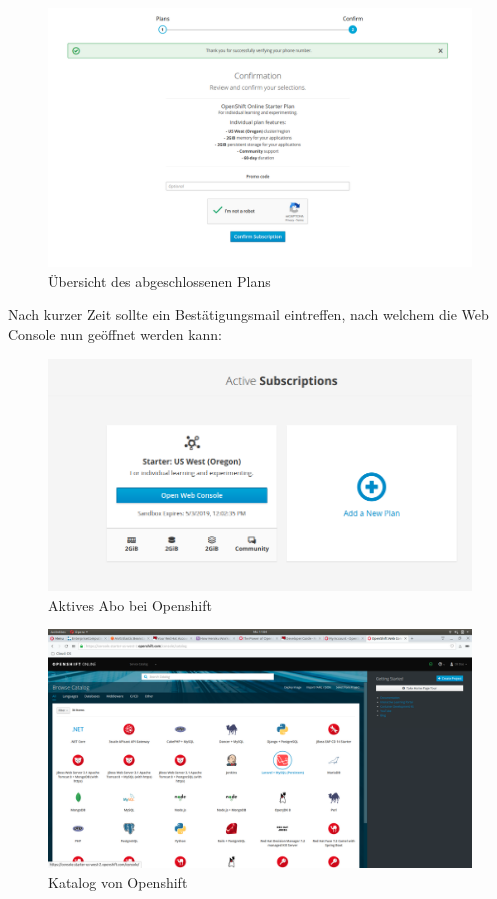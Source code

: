 \documentclass[12pt,a4paper]{article}
\begin{document}
\begin{figure}
	\centering
	\includegraphics[width=0.7\linewidth]{img/os-overview}
	\caption{Übersicht des abgeschlossenen Plans}
	\label{fig:os-overview}
\end{figure}
Nach kurzer Zeit sollte ein Bestätigungsmail eintreffen, nach welchem die Web Console nun geöffnet werden kann:
\begin{figure}[h]
	\centering
	\includegraphics[width=0.7\linewidth]{img/os-web-console}
	\caption{Aktives Abo bei Openshift}
	\label{fig:os-web-console}
\end{figure}

\begin{figure}[h]
	\centering
	\includegraphics[width=0.7\linewidth]{img/os-overview-catalog}
	\caption{Katalog von Openshift}
	\label{fig:os-overview-catalog}
\end{figure}
\end{document}
